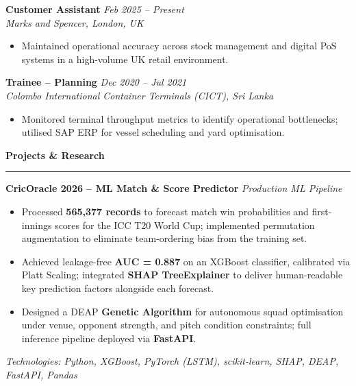 \documentclass[a4paper,10pt]{article}
\newcommand{\sect}[1]{\vspace{8pt}\noindent\textbf{\color{heading}\large #1}\vspace{3pt}\hrule\vspace{6pt}}
\begin{document}
\noindent\textbf{Customer Assistant} \hfill \textit{Feb 2025 -- Present} \\
\textit{Marks and Spencer, London, UK}
\begin{itemize}[leftmargin=*, topsep=2pt, itemsep=1pt]
    \item Maintained operational accuracy across stock management and digital PoS systems in a high-volume UK retail environment.
\end{itemize}
\vspace{4pt}

\noindent\textbf{Trainee -- Planning} \hfill \textit{Dec 2020 -- Jul 2021} \\
\textit{Colombo International Container Terminals (CICT), Sri Lanka}
\begin{itemize}[leftmargin=*, topsep=2pt, itemsep=1pt]
    \item Monitored terminal throughput metrics to identify operational bottlenecks; utilised SAP ERP for vessel scheduling and yard optimisation.
\end{itemize}

\sect{Projects \& Research}

\noindent\textbf{CricOracle 2026 -- ML Match \& Score Predictor} \hfill \textit{Production ML Pipeline}
\begin{itemize}[leftmargin=*, topsep=4pt, itemsep=2pt]
    \item Processed \textbf{565,377 records} to forecast match win probabilities and first-innings scores for the ICC T20 World Cup; implemented permutation augmentation to eliminate team-ordering bias from the training set.
    \item Achieved leakage-free \textbf{AUC = 0.887} on an XGBoost classifier, calibrated via Platt Scaling; integrated \textbf{SHAP TreeExplainer} to deliver human-readable key prediction factors alongside each forecast.
    \item Designed a DEAP \textbf{Genetic Algorithm} for autonomous squad optimisation under venue, opponent strength, and pitch condition constraints; full inference pipeline deployed via \textbf{FastAPI}.
\end{itemize}
\textit{Technologies: Python, XGBoost, PyTorch (LSTM), scikit-learn, SHAP, DEAP, FastAPI, Pandas}
\vspace{8pt}
\end{document}
